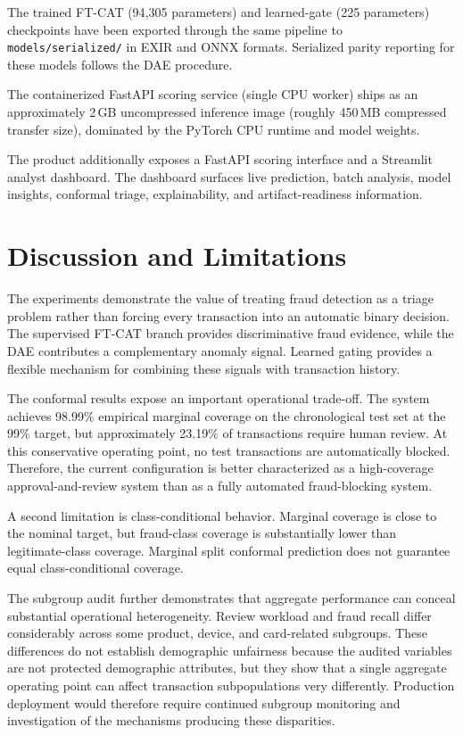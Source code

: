 \documentclass[conference]{IEEEtran}
\begin{document}
The trained FT-CAT (94{,}305 parameters) and learned-gate (225 parameters)
checkpoints have been exported through the same pipeline to
\texttt{models/serialized/} in EXIR and ONNX formats. Serialized parity
reporting for these models follows the DAE procedure.

The containerized FastAPI scoring service (single CPU worker) ships as an
approximately 2\,GB uncompressed inference image (roughly 450\,MB compressed
transfer size), dominated by the PyTorch CPU runtime and model weights.

The product additionally exposes a FastAPI scoring interface and a Streamlit
analyst dashboard. The dashboard surfaces live prediction, batch analysis,
model insights, conformal triage, explainability, and artifact-readiness
information.

\section{Discussion and Limitations}
\label{sec:discussion}

The experiments demonstrate the value of treating fraud detection as a triage
problem rather than forcing every transaction into an automatic binary decision.
The supervised FT-CAT branch provides discriminative fraud evidence, while the
DAE contributes a complementary anomaly signal. Learned gating provides a
flexible mechanism for combining these signals with transaction history.

The conformal results expose an important operational trade-off. The system
achieves 98.99\% empirical marginal coverage on the chronological test set at
the 99\% target, but approximately 23.19\% of transactions require human review.
At this conservative operating point, no test transactions are automatically
blocked. Therefore, the current configuration is better characterized as a
high-coverage approval-and-review system than as a fully automated
fraud-blocking system.

A second limitation is class-conditional behavior. Marginal coverage is close
to the nominal target, but fraud-class coverage is substantially lower than
legitimate-class coverage. Marginal split conformal prediction does not
guarantee equal class-conditional coverage.

The subgroup audit further demonstrates that aggregate performance can conceal
substantial operational heterogeneity. Review workload and fraud recall differ
considerably across some product, device, and card-related subgroups. These
differences do not establish demographic unfairness because the audited
variables are not protected demographic attributes, but they show that a
single aggregate operating point can affect transaction subpopulations very
differently. Production deployment would therefore require continued subgroup
monitoring and investigation of the mechanisms producing these disparities.
\end{document}
